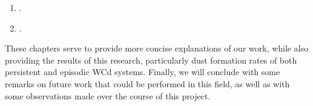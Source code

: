 \begin{enumerate}
  \item \emph{\firstpapertitle} .
  \item \emph{\secondpapertitle} .
\end{enumerate}

\noindent
These chapters serve to provide more concise explanations of our work, while also providing the results of this research, particularly dust formation rates of both persistent and episodic WCd systems.
Finally, we will conclude with some remarks on future work that could be performed in this field, as well as with some observations made over the course of this project.